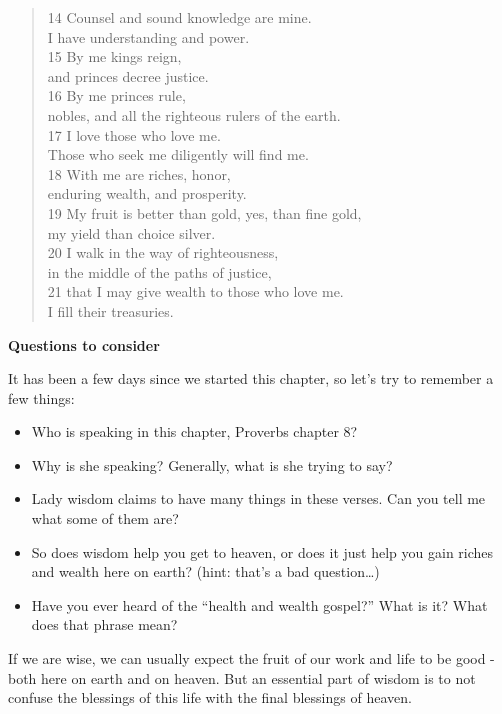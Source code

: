 \documentclass[
]{book}
\providecommand{\tightlist}{%
  \setlength{\itemsep}{0pt}\setlength{\parskip}{0pt}}
\begin{document}
\begin{quote}
14 Counsel and sound knowledge are mine.\\
I have understanding and power.\\
15 By me kings reign,\\
and princes decree justice.\\
16 By me princes rule,\\
nobles, and all the righteous rulers of the earth.\\
17 I love those who love me.\\
Those who seek me diligently will find me.\\
18 With me are riches, honor,\\
enduring wealth, and prosperity.\\
19 My fruit is better than gold, yes, than fine gold,\\
my yield than choice silver.\\
20 I walk in the way of righteousness,\\
in the middle of the paths of justice,\\
21 that I may give wealth to those who love me.\\
I fill their treasuries.
\end{quote}

\textbf{Questions to consider}

It has been a few days since we started this chapter, so let's try to remember a few things:

\begin{itemize}
\tightlist
\item
  Who is speaking in this chapter, Proverbs chapter 8?
\item
  Why is she speaking? Generally, what is she trying to say?
\item
  Lady wisdom claims to have many things in these verses. Can you tell me what some of them are?
\item
  So does wisdom help you get to heaven, or does it just help you gain riches and wealth here on earth? (hint: that's a bad question\ldots)
\item
  Have you ever heard of the ``health and wealth gospel?'' What is it? What does that phrase mean?
\end{itemize}

If we are wise, we can usually expect the fruit of our work and life to be good - both here on earth and on heaven. But an essential part of wisdom is to not confuse the blessings of this life with the final blessings of heaven.
\end{document}
